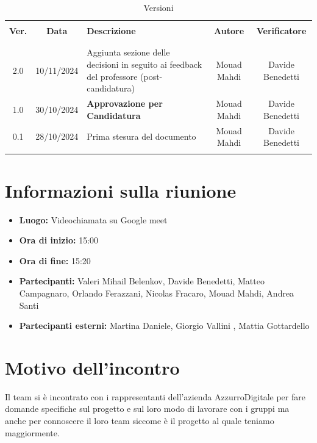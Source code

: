 \documentclass[italian, 12pt]{article}
\begin{document}
\pagestyle{mystyle}


\begin{table}[!h]
	\caption{Versioni}
	\begin{center}
		\begin{tabular}{ c c p{6.2cm} c c}
			\hline \\[-2ex]
			\textbf{Ver.} & \textbf{Data} & \textbf{Descrizione} & \textbf{Autore} & \textbf{Verificatore}  \\
			\\[-2ex] \hline \\[-1.5ex]
            2.0 & 10/11/2024 & Aggiunta sezione delle decisioni in seguito ai feedback del professore (post-candidatura) & Mouad Mahdi & Davide Benedetti\\
            1.0 & 30/10/2024 & \textbf{Approvazione per Candidatura} & Mouad Mahdi & Davide Benedetti\\
			0.1 & 28/10/2024 & Prima stesura del documento & Mouad Mahdi & Davide Benedetti\\
			\\[-1.5ex] \hline
		\end{tabular}
	\end{center}
\end{table}


\tableofcontents
\newpage


\section{Informazioni sulla riunione}
\begin{itemize}
    \item \textbf{Luogo:} Videochiamata su Google meet
    \item \textbf{Ora di inizio:} 15:00
    \item \textbf{Ora di fine:} 15:20
    \item \textbf{Partecipanti:} Valeri Mihail Belenkov, Davide Benedetti, Matteo Campagnaro, Orlando Ferazzani, Nicolas Fracaro, Mouad Mahdi, Andrea Santi 
    \item \textbf{Partecipanti esterni:} Martina Daniele, Giorgio Vallini , Mattia Gottardello
\end{itemize}

\section{Motivo dell'incontro}
Il team si è incontrato con i rappresentanti dell'azienda AzzurroDigitale per fare domande specifiche sul progetto e sul loro modo di lavorare con i gruppi ma anche per connoscere il loro team siccome è il progetto al quale teniamo maggiormente.
\end{document}
